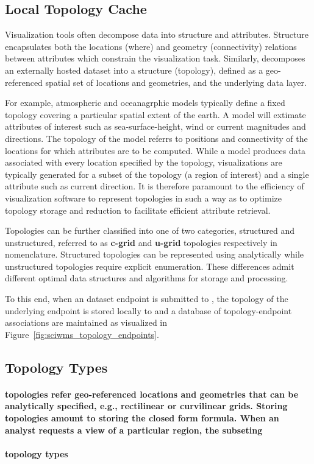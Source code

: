 \subsection{Local Topology Cache}
Visualization tools often decompose data into structure and
attributes.  Structure encapsulates both the locations (where) and
geometry (connectivity) relations between attributes which constrain
the visualization task. Similarly, \sciwms{} decomposes an externally
hosted dataset into a structure (topology), defined as a
geo-referenced spatial set of locations and geometries, and the
underlying data layer.

For example, atmospheric and oceanagrphic models typically define a
fixed topology covering a particular spatial extent of the earth. A
model will extimate attributes of interest such as sea-surface-height,
wind or current magnitudes and directions. The topology of the model
referrs to positions and connectivity of the locations for which
attributes are to be computed. While a model produces data associated
with every location specified by the topology, visualizations are
typically generated for a subset of the topology (a region of
interest) and a single attribute such as current direction. It is
therefore paramount to the efficiency of visualization software to
represent topologies in such a way as to optimize topology storage and
reduction to facilitate efficient attribute retrieval. 

Topologies can be further classified into one of two categories,
structured and unstructured, referred to as {\bf c-grid} and {\bf
  u-grid} topologies respectively in \sciwms{}
nomenclature. Structured topologies can be represented using
analytically while unstructured topologies require explicit
enumeration. These differences admit different optimal data structures
and algorithms for storage and processing.

To this end, when an dataset endpoint is submitted to \sciwms{}, the
topology of the underlying endpoint is stored locally to \sciwms{} and
a database of topology-endpoint associations are maintained as
visualized in Figure~\ref{fig:sciwms_topology_endpoints}. 

\subsection{Topology Types}
\paragraph{{\bf \cgrid{}} topologies refer geo-referenced locations and geometries that can be analytically specified, e.g., rectilinear
or curvilinear grids. Storing \cgrid{} topologies amount to storing
the closed form formula. When an analyst requests a view of a
particular region, the subseting}

\paragraph{{\bf \ugrid{}} topology types} 
